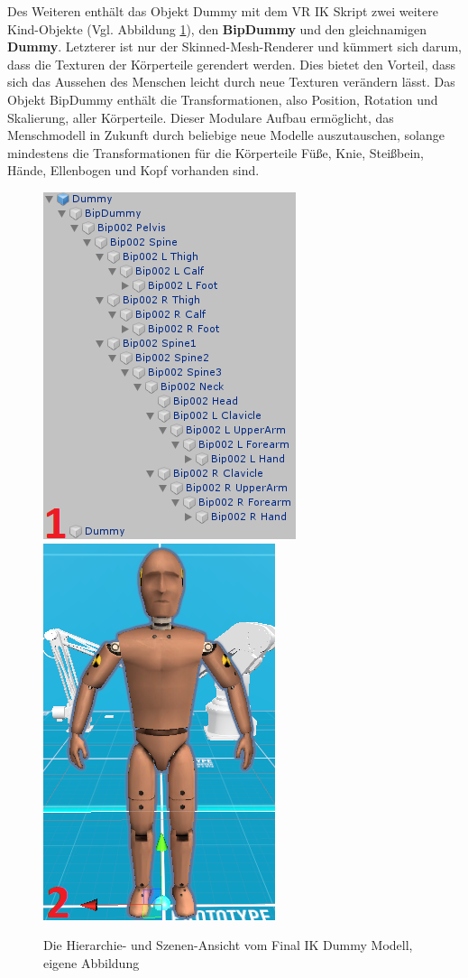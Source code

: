 \newline
Des Weiteren enthält das Objekt Dummy mit dem VR IK Skript zwei weitere Kind-Objekte (Vgl. Abbildung \ref{fig:Dummy}), den \textbf{BipDummy} und den gleichnamigen \textbf{Dummy}. Letzterer ist nur der Skinned-Mesh-Renderer und kümmert sich darum, dass die Texturen der Körperteile gerendert werden. Dies bietet den Vorteil, dass sich das Aussehen des Menschen leicht durch neue Texturen verändern lässt. Das Objekt BipDummy enthält die Transformationen, also Position, Rotation und Skalierung, aller Körperteile. Dieser Modulare Aufbau ermöglicht, das Menschmodell in Zukunft durch beliebige neue Modelle auszutauschen, solange mindestens die Transformationen für die Körperteile Füße, Knie, Steißbein, Hände, Ellenbogen und Kopf vorhanden sind.
\begin{figure}[h]
	\centering
	\includegraphics[width=0.35\linewidth]{Bilder/A34_DummyAufbau2}
	\includegraphics[width=0.296\linewidth]{Bilder/A35_Dummy2}
	\caption{Die Hierarchie- und Szenen-Ansicht vom Final IK Dummy Modell, eigene Abbildung}
	\label{fig:Dummy}
\end{figure}
\newpage

